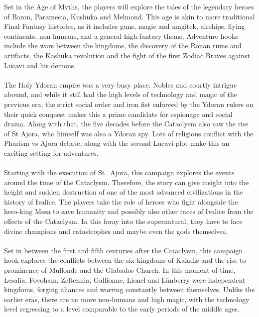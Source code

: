 \begin{multicols}{2}
%
Set in the Age of Myths, the players will explore the tales of the legendary heroes of Baron, Paramecia, Kushuka and Melmond. This age is akin to more
traditional Final Fantasy histories, as it includes guns, magic and magitek, airships, flying continents, non-humans, and a general high-fantasy theme.
Adventure hooks include the wars between the kingdoms, the discovery of the Ronan ruins and artifacts, the Kashuka revolution and the fight of the first Zodiac Braves against Lucavi and his demons.
%
\\\\
%
The Holy Ydoran empire was a very busy place. 
Nobles and courtly intrigue abound, and while it still had the high levels of technology and magic of the previous era, the strict social order and iron fist enforced by the Ydoran rulers on their quick conquest makes this a prime candidate for espionage and social drama.
Along with that, the five decades before the Cataclysm also saw the rise of St Ajora, who himself was also a Ydoran spy.
Lots of religious conflict with the Pharism vs Ajora debate, along with the second Lucavi plot make this an exciting setting for adventures.
%
\\\\
%
Starting with the execution of St.~Ajora, this campaign explores the events around the time of the Cataclysm.
Therefore, the story can give insight into the height and sudden destruction of one of the most advanced civilizations in the history of Ivalice.
The players take the role of heroes who fight alongside the hero-king Mesa to save humanity and possibly also other races of Ivalice from the effects of the Cataclysm.
In this foray into the supernatural, they have to face divine champions and catastrophes and maybe even the gods themselves.\\
%
\columnbreak\\
%
Set in between the first and fifth centuries after the Cataclysm, this campaign hook explores the conflicts between the six kingdoms of Kaladis and the rise to prominence of Mullonde and the Glabados Church.
In this moment of time, Lesalia, Fovoham, Zeltennia, Gallionne, Lionel and Limberry were independent kingdoms, forging aliances and warring constantly between themselves. 
Unlike the earlier eras, there are no more non-humans and high magic, with the technology level regressing to a level comparable to the early periods of the middle ages.

\end{multicols}
